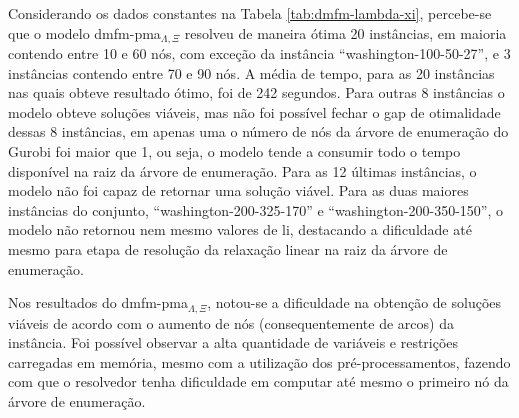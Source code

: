 Considerando os dados constantes  na Tabela \ref{tab:dmfm-lambda-xi}, percebe-se
que  o  modelo \gls{dmfm-pma}$_{\Lambda,  \Xi}$  resolveu  de maneira  ótima  20
instâncias, em  maioria contendo  entre 10  e 60 nós,  com exceção  da instância
``washington-100-50-27'', e 3 instâncias contendo entre  70 e 90 nós. A média de
tempo,  para as  20 instâncias  nas  quais obteve  resultado ótimo,  foi de  242
segundos. Para outras 8 instâncias o modelo obteve soluções viáveis, mas não foi
possível fechar o gap de otimalidade dessas 8 instâncias, em apenas uma o número
de nós  da árvore de  enumeração do Gurobi  foi maior que  1, ou seja,  o modelo
tende a consumir todo  o tempo disponível na raiz da  árvore de enumeração. Para
as 12 últimas instâncias, o modelo não foi capaz de retornar uma solução viável.
Para  as  duas  maiores  instâncias do  conjunto,  ``washington-200-325-170''  e
``washington-200-350-150'', o modelo não retornou nem mesmo valores de \gls{li},
destacando a dificuldade  até mesmo para etapa de resolução  da relaxação linear
na raiz da árvore de enumeração.

Nos  resultados do  \gls{dmfm-pma}$_{\Lambda, \Xi}$,  notou-se a  dificuldade na
obtenção de soluções viáveis de acordo com o aumento de nós (consequentemente de
arcos) da  instância. Foi  possível observar  a alta  quantidade de  variáveis e
restrições carregadas em memória, mesmo com a utilização dos pré-processamentos,
fazendo com que o resolvedor tenha  dificuldade em computar até mesmo o primeiro
nó da árvore de enumeração.

